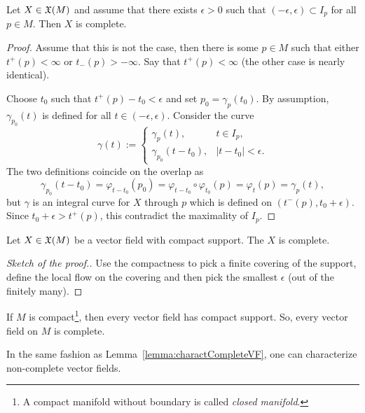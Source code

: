 \begin{lemma}\label{lemma:charactCompleteVF}
  Let $X\in\mathfrak{X}(M)$ and assume that there exists $\epsilon >0$ such that $(-\epsilon, \epsilon)\subset I_p$ for all $p \in M$.
  Then $X$ is complete.
\end{lemma}
\begin{proof}
  Assume that this is not the case, then there is some $p\in M$ such that either $t^+(p) < \infty$ or $t_-(p)>-\infty$.
  Say that $t^+(p) < \infty$ (the other case is nearly identical).

  Choose $t_0$ such that $t^+(p) - t_0 < \epsilon$ and set $p_0 = \gamma_p(t_0)$. By assumption, $\gamma_{p_0}(t)$ is defined for all $t\in(-\epsilon, \epsilon)$. Consider the curve
  \begin{equation}
    \gamma(t) := \begin{cases}
      \gamma_p(t),         & t\in I_p,         \\
      \gamma_{p_0}(t-t_0), & |t-t_0|<\epsilon.
    \end{cases}
  \end{equation}
  The two definitions coincide on the overlap as
  \begin{equation}
    \gamma_{p_0}(t-t_0) = \varphi_{t-t_0}(p_0) = \varphi_{t-t_0}\circ\varphi_{t_0}(p) = \varphi_t(p) = \gamma_p(t),
  \end{equation}
  but $\gamma$ is an integral curve for $X$ through $p$ which is defined on $(t^-(p), t_0+\epsilon)$.
  Since $t_0 + \epsilon > t^+(p)$, this contradict the maximality of $I_p$.
\end{proof}

\begin{corollary}
  Let $X\in\mathfrak{X}(M)$ be a vector field with compact support. The $X$ is complete.
\end{corollary}
\begin{proof}[Sketch of the proof.]
  Use the compactness to pick a finite covering of the support, define the local flow on the covering and then pick the smallest $\epsilon$ (out of the finitely many).
\end{proof}

\begin{corollary}
  If $M$ is compact\footnote{A compact manifold without boundary is called \emph{closed manifold}.}, then every vector field has compact support.
  So, every vector field on $M$ is complete.
\end{corollary}

In the same fashion as Lemma~\ref{lemma:charactCompleteVF}, one can characterize non-complete vector fields.

